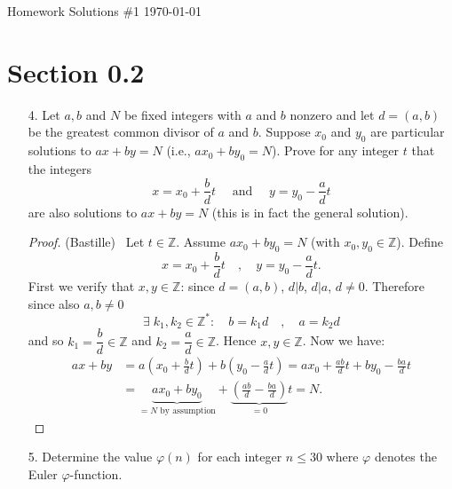 \documentclass[10pt]{article}
\newcommand{\Z}{\mathbb{Z}}
\newcommand\header{{\sc 631 Homework Solutions \#1 \hfill \today}}
\begin{document}
\header


\section*{Section 0.2}

\begin{itemize}

\item[4.] Let $a,b$ and $N$ be fixed integers with $a$ and $b$ nonzero and let $d=(a,b)$ be the greatest common divisor of $a$ and $b$. Suppose $x_0$ and $y_0$ are particular solutions to $ax+by=N$ (i.e., $ax_0+by_0=N$). Prove for any integer $t$ that the integers
$$ x=x_0+\frac{b}{d}t \quad \text{ and } \quad y=y_0-\frac{a}{d}t $$
are also solutions to $ax+by=N$ (this is in fact the general solution).
\begin{proof} (Bastille) \ Let $t \in \Z$. Assume $ax_0+by_0=N$ (with $x_0,y_0 \in \Z$). Define
$$x=x_0+\frac{b}{d}t \quad , \quad y=y_0-\frac{a}{d}t. $$
First we verify that $x,y \in \Z$: since $d=(a,b)$, $d|b$, $d|a$, $d \neq 0$. Therefore since also $a,b \neq 0$
$$ \exists \; k_1, k_2 \in \Z^{*}: \quad b=k_1d \quad ,\quad  a=k_2d$$
and so $k_1=\dfrac{b}{d} \in \Z$ and $k_2=\dfrac{a}{d} \in \Z$. Hence $x,y \in \Z$. Now we have:
\begin{align*}
ax+by &= a \left(x_0+\frac{b}{d}t\right)+b\left(y_0-\frac{a}{d}t\right) = ax_0+\frac{ab}{d}t+by_0-\frac{ba}{d}t \\
      &= \underbrace{ax_0+by_0}_{=N \text{ by assumption}}+\underbrace{\left(\frac{ab}{d}-\frac{ba}{d}\right)}_{=0}t =N.
\end{align*}
\end{proof}
\item[5.]Determine the value $\varphi(n)$ for each integer $n \leq 30$ where $\varphi$ denotes the Euler $\varphi$-function.


\end{itemize}
\end{document}
